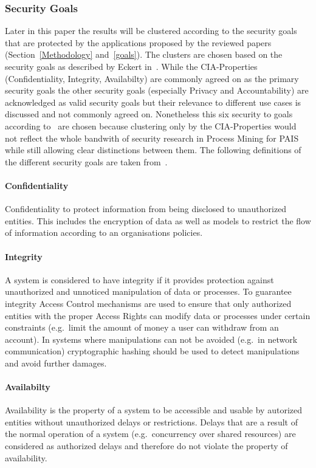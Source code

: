 \documentclass[runningheads]{llncs}
\begin{document}
\subsubsection{Security Goals}\label{goals_def}
Later in this paper the results will be clustered according to the security goals that are protected by the applications proposed by the reviewed papers (Section~\ref{Methodology} and~\ref{goals}). 
The clusters are chosen based on the security goals as described by Eckert in~\cite{Eckert}. While the CIA-Properties (Confidentiality, Integrity, Availabilty) are commonly agreed on as the 
primary security goals the other security goals (especially Privacy and Accountability) are acknowledged as valid security goals but their relevance to different use cases is discussed and 
not commonly agreed on. %
Nonetheless this six security to goals according to~\cite{Eckert} are chosen because clustering only by the CIA-Properties would not reflect the whole bandwith of security research in Process Mining
for PAIS while still allowing clear distinctions between them. The following definitions of the different security goals are taken from~\cite{Eckert}.
\paragraph{Confidentiality} Confidentiality to protect information from being disclosed to unauthorized entities. This includes the encryption of data as well as models to restrict the flow of 
information according to an organisations policies.
\paragraph{Integrity} A system is considered to have integrity if it provides protection against unauthorized and unnoticed manipulation of data or processes. To guarantee integrity
Access Control mechanisms are used to ensure that only authorized entities with the proper Access Rights can modify data or processes under certain constraints (e.g.\ limit the amount of money
a user can withdraw from an account). In systems where manipulations can not be avoided (e.g.\ in network communication) cryptographic hashing should be used to detect manipulations and 
avoid further damages.
\paragraph{Availabilty} Availability is the property of a system to be accessible and usable by autorized entities without unauthorized delays or restrictions. Delays that are a result of the
normal operation of a system (e.g.\ concurrency over shared resources) are considered as authorized delays and therefore do not violate the property of availability.
\end{document}
